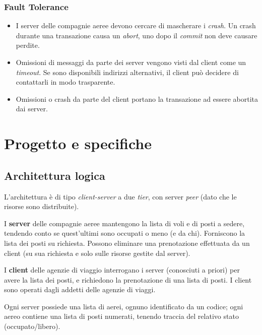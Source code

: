 \documentclass[a4paper]{article}
\begin{document}
\subsubsection{Fault Tolerance}
\begin{itemize}
	\item I server delle compagnie aeree devono cercare di mascherare i \textit{crash}. Un crash durante una transazione causa un \textit{abort}, uno dopo il \textit{commit} non deve causare perdite.
	\item Omissioni di messaggi da parte dei server vengono visti dal client come un \textit{timeout}. Se sono disponibili indirizzi alternativi, il client può decidere di contattarli in modo trasparente.
	\item Omissioni o crash da parte del client portano la transazione ad essere abortita dai server.
\end{itemize}


\section{Progetto e specifiche}

\subsection{Architettura logica}

L'architettura è di tipo \textit{client-server} a due \textit{tier}, con server \textit{peer} (dato che le risorse sono distribuite).

I \textbf{server} delle compagnie aeree mantengono la lista di voli e di posti a sedere, tendendo conto se quest'ultimi sono occupati o meno (e da chi). Forniscono la lista dei posti su richiesta. Possono eliminare una prenotazione effettuata da un client (su sua richiesta e solo sulle risorse gestite dal server).

I \textbf{client} delle agenzie di viaggio interrogano i server (conosciuti a priori) per avere la lista dei posti, e richiedono la prenotazione di una lista di posti. I client sono operati dagli addetti delle agenzie di viaggi.

Ogni server possiede una lista di aerei, ognuno identificato da un codice; ogni aereo contiene una lista di posti numerati, tenendo traccia del relativo stato (occupato/libero).
\end{document}
